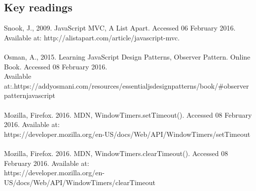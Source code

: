 \documentclass[paper=a4, fontsize=10pt]{article}
\begin{document}
\subsection*{Key readings}
{\footnotesize Snook, J., 2009. JavaScript MVC, A List Apart. Accessed 06 February 2016. \\Available at: http://alistapart.com/article/javascript-mvc.\\\\
Osman, A., 2015. Learning JavaScript Design Patterns, Observer Pattern. Online Book. Accessed 08 February 2016. \\Available at:.https://addyosmani.com/resources/essentialjsdesignpatterns/book/\#observerpatternjavascript\\\\
Mozilla, Firefox. 2016. MDN, WindowTimers.setTimeout(). Accessed 08 February 2016. Available at:\\ 
https://developer.mozilla.org/en-US/docs/Web/API/WindowTimers/setTimeout\\\\
Mozilla, Firefox. 2016. MDN, WindowTimers.clearTimeout(). Accessed 08 February 2016. Available at:\\
https://developer.mozilla.org/en-US/docs/Web/API/WindowTimers/clearTimeout
}
\end{document}
